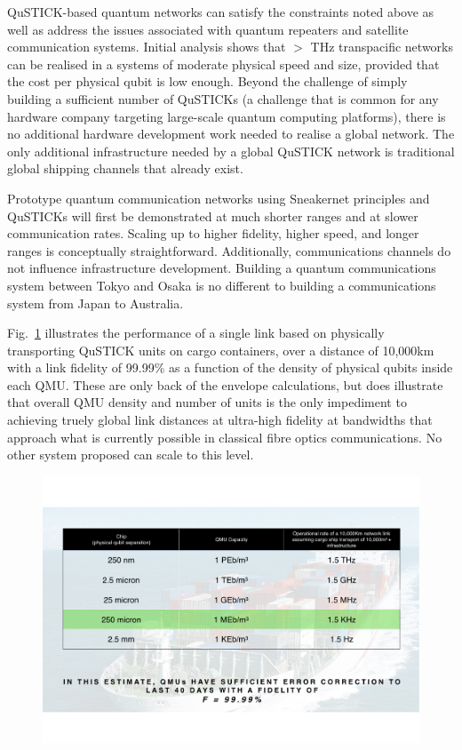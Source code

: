 \documentclass[twocolumn, aps, rmp, amsmath, amssymb, nofootinbib, superscriptaddress, longbibliography, floatfix, table-of-contents, eqsecnum]{revtex4-2}
\begin{document}
QuSTICK-based quantum networks can satisfy the constraints noted above as well as address the issues associated with quantum repeaters and satellite communication systems. Initial analysis shows that $>$ THz transpacific networks can be realised in a systems of moderate physical speed and size, provided that the cost per physical qubit is low enough. Beyond the challenge of simply building a sufficient number of QuSTICKs (a challenge that is common for any hardware company targeting large-scale quantum computing platforms), there is no additional hardware development work needed to realise a global network. The only additional infrastructure needed by a global QuSTICK network is traditional global shipping channels that already exist. 

Prototype quantum communication networks using Sneakernet principles and QuSTICKs will first be demonstrated at much shorter ranges and at slower communication rates. Scaling up to higher fidelity, higher speed, and longer ranges is conceptually straightforward. Additionally, communications channels do not influence infrastructure development. Building a quantum communications system between Tokyo and Osaka is no different to building a communications system from Japan to Australia. 

Fig.~\ref{fig:link} illustrates the performance of a single link based on physically transporting QuSTICK units on cargo containers, over a distance of 10,000km with a link fidelity of 99.99\% as a function of the density of physical qubits inside each QMU. These are only back of the envelope calculations, but does illustrate that overall QMU density and number of units is the only impediment to achieving truely global link distances at ultra-high fidelity at bandwidths that approach what is currently possible in classical fibre optics communications. No other system proposed can scale to this level.
 
\begin{figure}[htbp!]
	\includegraphics[clip=true, width=\columnwidth]{link}
	\caption{} \label{fig:link}
\end{figure}
\end{document}
